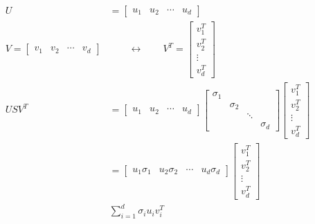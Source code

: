 \documentclass[12pt]{article}
\begin{document}
\begin{align}
U &= 
	\begin{bmatrix}
	u_1 & u_2 & \cdots & u_d 
	\end{bmatrix} \\
V = 
	\begin{bmatrix}
	v_1 & v_2 & \cdots & v_d 
	\end{bmatrix}&
	\qquad \leftrightarrow \qquad
V^T = 
	\begin{bmatrix}
	v_1^T \\ v_2^T \\ \vdots \\ v_d^T 
	\end{bmatrix}\\
U S V^T &= 
	\begin{bmatrix}
	u_1 & u_2 & \cdots & u_d 
	\end{bmatrix}
	\begin{bmatrix}
		\sigma_1 \\
		& \sigma_2 \\
		&&\ddots\\
		&&&\sigma_d
	\end{bmatrix}
	\begin{bmatrix}
	v_1^T \\ v_2^T \\ \vdots \\ v_d^T 
	\end{bmatrix} \\
	&= 
	\begin{bmatrix}
	u_1\sigma_1 & u_2\sigma_2 & \cdots & u_d \sigma_d
	\end{bmatrix}
	\begin{bmatrix}
	v_1^T \\ v_2^T \\ \vdots \\ v_d^T 
	\end{bmatrix} \\
	&\sum_{i = 1}^{d} \sigma_i u_i v_i^T
\end{align}

\end{document}
